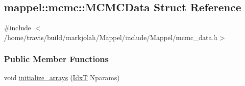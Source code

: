\hypertarget{structmappel_1_1mcmc_1_1MCMCData}{}\subsection{mappel\+:\+:mcmc\+:\+:M\+C\+M\+C\+Data Struct Reference}
\label{structmappel_1_1mcmc_1_1MCMCData}


{\ttfamily \#include $<$/home/travis/build/markjolah/\+Mappel/include/\+Mappel/mcmc\+\_\+data.\+h$>$}

\subsubsection*{Public Member Functions}
\begin{DoxyCompactItemize}
\item 
void \hyperlink{structmappel_1_1mcmc_1_1MCMCData_aa618dcd5d9b5d46ec5163f3f64acf5f3}{initialize\+\_\+arrays} (\hyperlink{namespacemappel_ab17ec0f30b61ece292439d7ece81d3a8}{IdxT} Nparams)
\end{DoxyCompactItemize}
